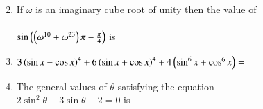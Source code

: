 \documentclass[journal,12pt,twocolumn]{IEEEtran}
\theoremstyle{remark}
\begin{document}
\begin{enumerate}
\begin{enumerate}[label={(\alph*)}]
\begin{multicols}{2}
            \end{multicols}

        \end{enumerate}

    \item If $\omega$ is an imaginary cube root of unity then the value of\\\\$\sin{\ensuremath{\left(\left(\omega^{10} + \omega^{23}\right)\pi - \frac{\pi}{4}\right)}}$ is
    
        \hfill{}
        \begin{enumerate}[label={(\alph*)}]
        \end{enumerate}

    \item $3\left(\sin{x} - \cos{x}\right)^4 + 6\left(\sin{x} + \cos{x}\right)^4 + 4\left(\sin^6{x}+\cos^6{x}\right) =$
        
        \hfill{}
        \begin{enumerate}[label={(\alph*)}]
        \end{enumerate}   

    \item The general values of $\theta$ satisfying the equation\\$2\sin^2{\theta}-3\sin{\theta}-2=0$ is
        

\end{enumerate}
\end{document}
